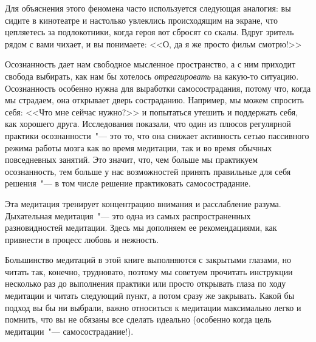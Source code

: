 Для объяснения этого феномена часто используется следующая аналогия: вы сидите в кинотеатре и настолько увлеклись происходящим на экране, что цепляетесь за подлокотники, когда героя вот сбросят со скалы. Вдруг зритель рядом с вами чихает, и вы понимаете: <<О, да я же просто фильм смотрю!>>

Осознанность дает нам свободное мысленное пространство, а с  ним приходит свобода выбирать, как нам бы хотелось \emph{отреагировать} на какую-то ситуацию. Осознанность особенно нужна для выработки самосострадания, потому что, когда мы страдаем, она открывает дверь состраданию. Например, мы можем спросить себя: <<Что мне сейчас нужно?>> и попытаться утешить и поддержать себя, как хорошего друга. Исследования показали, что один из плюсов регулярной практики осознанности~"--- это то, что она снижает активность сетью пассивного режима работы мозга как во время медитации, так и во время обычных повседневных занятий\cite{58,59}. Это значит, что, чем больше мы практикуем осознанность, тем больше у нас возможностей принять правильные для себя решения~"--- в том числе решение практиковать самосострадание. 

\newpage
{}\label{medit:Affectionate_Breathing}

Эта медитация тренирует концентрацию внимания и расслабление разума. Дыхательная медитация~"--- это одна из самых распространенных разновидностей медитации. Здесь мы дополняем ее рекомендациями, как привнести в процесс любовь и нежность.

Большинство медитаций в этой книге выполняются с закрытыми глазами, но читать так, конечно, трудновато, поэтому мы советуем прочитать инструкции несколько раз до выполнения практики или просто открывать глаза по ходу медитации и читать следующий пункт, а потом сразу же закрывать. Какой бы подход вы бы ни выбрали, важно относиться к медитации максимально легко и помнить, что вы не обязаны все сделать идеально (особенно когда цель медитации~"--- самосострадание!).


